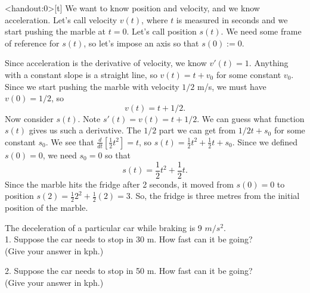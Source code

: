 \begin{frame}<handout:0>[t]
\color{answercolor}
We want to know position and velocity, and we know acceleration. Let's call velocity $v(t)$, where $t$ is measured in seconds and we start pushing the marble at $t=0$. Let's call position $s(t)$. We need some frame of reference for $s(t)$, so let's impose an axis so that $s(0):=0$.

\smallskip
Since acceleration is the derivative of velocity, we know $v'(t)=1$. Anything with a constant slope is a straight line, so $v(t)=t+v_0$ for some constant $v_0$. Since we start pushing the marble with velocity $1/2$ m/s, we must have $v(0)=1/2$, so
\[v(t)=t+1/2.\]
Now consider $s(t)$. Note $s'(t)=v(t)=t+1/2$. We can guess what function $s(t)$ gives us such a derivative. The $1/2$ part we can get from $1/2t+s_0$ for some constant $s_0$. We see that $\frac{d}{dt}[\frac{1}{2}t^2]=t$, so $s(t)=\frac{1}{2}t^2+\frac{1}{2}t+s_0$. Since we defined $s(0)=0$, we need $s_0=0$ so that
\[s(t)=\frac{1}{2}t^2+\frac{1}{2}t.\] 
Since the marble hits the fridge after 2 seconds, it moved from $s(0)=0$ to position $s(2)=\frac{1}{2}2^2+\frac{1}{2}(2)=3$. So, the fridge is three metres from the initial position of the marble.
\end{frame}
\begin{frame}[t]
\AnswerYes\MoreSpace
The deceleration of a particular car while braking is 9 $m/s^2$.\\
\textcolor{C3}{1. Suppose the car needs to stop in 30 m. How fast can it be going?} \\(Give your answer in kph.)

\vfill

\textcolor{C1}{2. Suppose the car needs to stop in 50 m. How fast can it be going?}\\ (Give your answer in kph.)

\end{frame}
